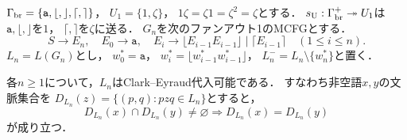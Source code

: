 $\Gamma_{\rm br}=\{\mathtt a,\lfloor,\rfloor,\lceil,\rceil\}$，
$U_1=\{1,\zeta\}$，
$1\zeta=\zeta1=\zeta^2=\zeta$とする．
$s_{\mathrm U}:\Gamma_{\rm br}^+\twoheadrightarrow U_1$は
$\mathtt a,\lfloor,\rfloor$を$1$，
$\lceil,\rceil$を$\zeta$に送る．
$G_n$を次のファンアウト1のMCFGとする．
\[
 S\to E_n,\quad E_0\to\mathtt a,\quad
 E_i\to\lfloor E_{i-1}E_{i-1}\rfloor
 \mid\lceil E_{i-1}\rceil\quad(1\le i\le n).
\]
$L_n=L(G_n)$とし，
$w_0^*=\mathtt a$，
$w_i^*=\lfloor w_{i-1}^*w_{i-1}^*\rfloor$，
$L_n^-=L_n\setminus\{w_n^*\}$と置く．
\begin{lemma}[括弧付き倍増言語族の代入可能性]
\label{lem:bracketed-doubling-substitutable}
各$n\ge1$について，$L_n$はClark--Eyraud代入可能である．
すなわち非空語$x,y$の文脈集合を
$D_{L_n}(z)=\{(p,q):pzq\in L_n\}$とすると，
\[
 D_{L_n}(x)\cap D_{L_n}(y)\ne\varnothing
 \Longrightarrow D_{L_n}(x)=D_{L_n}(y)
\]
が成り立つ．
\end{lemma}
